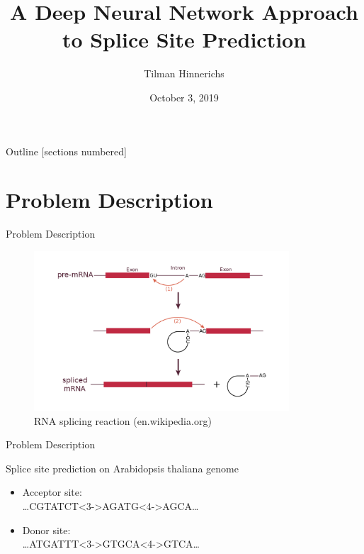\documentclass[10pt]{beamer}
\title{A Deep Neural Network Approach to Splice Site Prediction}
\author{Tilman Hinnerichs}
\institute{Knowledge Mining Lab -- KAUST}
\date{October 3, 2019}
\begin{document}
	
\begin{frame}
	\titlepage
\end{frame}

\begin{frame}{Outline}
	[sections numbered]
	\tableofcontents
\end{frame}

\section{Problem Description}
\begin{frame}{Problem Description}
	\begin{figure}[ht]
		\centering
		\includegraphics[width = 0.85\textwidth]{RNA_splicing_reaction.png}
		\caption{RNA splicing reaction (en.wikipedia.org)}
	\end{figure}
\end{frame}

\begin{frame}{Problem Description}
	
	\large Splice site prediction on Arabidopsis thaliana genome
	\vspace{0.5cm}
	\pause
	\begin{exampleblock}{}
		\begin{itemize}
			\item Acceptor site:\\
			\dots CGTATCT<3->{AG}ATG<4->{AG}CA\dots
			\item Donor site:\\
			\dots ATGATTT<3->{GT}GCA<4->{GT}CA\dots
			
		\end{itemize}
	\end{exampleblock}
	
\end{frame}
\end{document}
